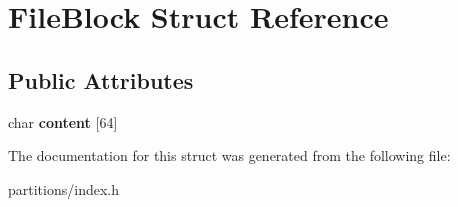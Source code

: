 \hypertarget{structFileBlock}{}\section{File\+Block Struct Reference}
\label{structFileBlock}
\subsection*{Public Attributes}
\begin{DoxyCompactItemize}
\item 
\mbox{\label{structFileBlock_a39884276ea655ff94d8f378968a1c57d}} 
char {\bfseries content} \mbox{[}64\mbox{]}
\end{DoxyCompactItemize}


The documentation for this struct was generated from the following file\+:\begin{DoxyCompactItemize}
\item 
partitions/index.\+h\end{DoxyCompactItemize}
